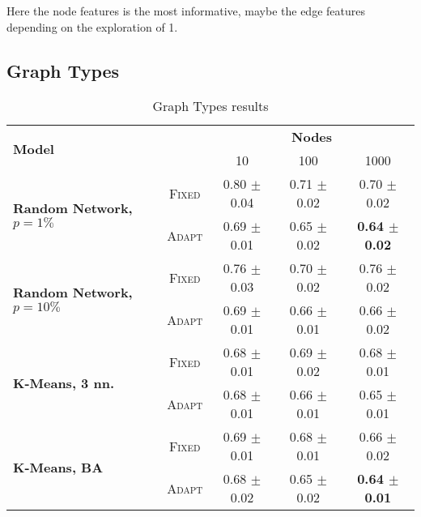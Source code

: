 \documentclass[a4paper,10pt]{article}
\begin{document}
Here the node features is the most informative, maybe the edge features depending on the exploration of 1.

\subsection{Graph Types}

\begin{table*}
  \label{tab:results}
  \centering
  \begin{tabular}{lcccc} \toprule
    \multirow{2}{*}{\textbf{Model}}                    &                            & \multicolumn{3}{c}{\textbf{Nodes}}                                                           \\ \cmidrule(lr){3-5}
                                                       &                            & 10                                 & 100                    & 1000                           \\ \hline
    \multirow{2}{*}{\textbf{Random Network, $p=1\%$} } & \scriptsize \textsc{Fixed} & 0.80  \tiny $\pm$ 0.04             & 0.71  \tiny $\pm$ 0.02 & 0.70 \tiny $\pm$ 0.02          \\
                                                       & \scriptsize \textsc{Adapt} & 0.69 \tiny $\pm$ 0.01              & 0.65 \tiny $\pm$ 0.02  & \textbf{0.64 \tiny $\pm$ 0.02} \\
    \multirow{2}{*}{\textbf{Random Network, $p=10\%$}} & \scriptsize \textsc{Fixed} & 0.76  \tiny $\pm$ 0.03             & 0.70  \tiny $\pm$ 0.02 & 0.76 \tiny $\pm$ 0.02          \\
                                                       & \scriptsize \textsc{Adapt} & 0.69 \tiny $\pm$ 0.01              & 0.66 \tiny $\pm$ 0.01  & 0.66 \tiny $\pm$ 0.02          \\
    \multirow{2}{*}{\textbf{K-Means, 3 nn.}          } & \scriptsize \textsc{Fixed} & 0.68  \tiny $\pm$ 0.01             & 0.69  \tiny $\pm$ 0.02 & 0.68 \tiny $\pm$ 0.01          \\
                                                       & \scriptsize \textsc{Adapt} & 0.68 \tiny $\pm$ 0.01              & 0.66 \tiny $\pm$ 0.01  & 0.65 \tiny $\pm$ 0.01          \\
    \multirow{2}{*}{\textbf{K-Means, BA}             } & \scriptsize \textsc{Fixed} & 0.69  \tiny $\pm$ 0.01             & 0.68  \tiny $\pm$ 0.01 & 0.66 \tiny $\pm$ 0.02          \\
                                                       & \scriptsize \textsc{Adapt} & 0.68 \tiny $\pm$ 0.02              & 0.65 \tiny $\pm$ 0.02  & \textbf{0.64 \tiny $\pm$ 0.01} \\

    \bottomrule
  \end{tabular}
  \caption{
    Graph Types results
  }
\end{table*}
\end{document}

